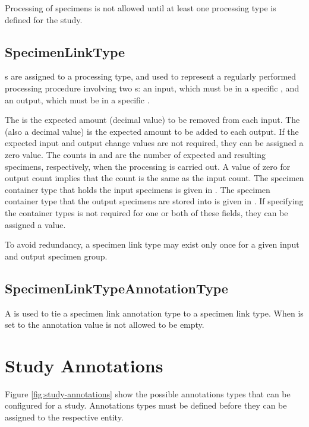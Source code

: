 Processing of specimens is not allowed until at least one processing type is
defined for the study.

\subsection*{SpecimenLinkType}

 s are assigned to
a processing type, and used to represent a regularly performed processing
procedure involving two s: an input, which must be in a
specific , and an output, which must be in a specific
.

The  is the expected amount (decimal value) to be
removed from each input. The  (also a decimal
value) is the expected amount to be added to each output. If the expected input
and output change values are not required, they can be assigned a zero value.
The counts in  and  are the number of
expected and resulting specimens, respectively, when the processing is carried
out. A value of zero for output count implies that the count is the same as the
input count. The specimen container type that holds the input specimens is
given in . The specimen container type that the
output specimens are stored into is given in . If
specifying the container types is not required for one or both of these fields,
they can be assigned a  value.

To avoid redundancy, a specimen link type may exist only once for a given input
and output specimen group.

\subsection*{SpecimenLinkTypeAnnotationType}

A  is used to tie a specimen
link annotation type to a specimen link type. When  is set to
 the annotation value is not allowed to be empty.

\section{Study Annotations}
\label{sec:study-annotations}

Figure \ref{fig:study-annotations} show the possible annotations types that can
be configured for a study. Annotations types must be defined before they can be
assigned to the respective entity.

